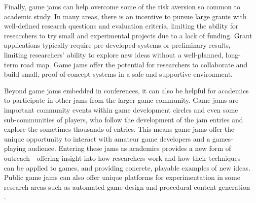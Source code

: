 \documentclass{acm_proc_article-sp}
\newcommand{\mytodo}[1]{\textbf{[[#1]]}}
\begin{document}

Finally, game jams can help overcome some of the risk aversion so common to academic study.
In many areas, there is an incentive to pursue large grants with well-defined research questions and evaluation criteria, limiting the ability for researchers to try small and experimental projects due to a lack of funding.
Grant applications typically require pre-developed systems or preliminary results, limiting researchers' ability to explore new ideas without a well-planned, long-term road map.
Game jams offer the potential for researchers to collaborate and build small, proof-of-concept systems in a safe and supportive environment.



Beyond game jams embedded in conferences, it can also be helpful for academics to participate in other jams from the larger game community.
Game jams are important community events within game development circles and even some sub-communities of players, who follow the development of the jam entries and explore the sometimes thousands of entries.
This means game jams offer the unique opportunity to interact with amateur game developers and a games-playing audience.
Entering these jams as academics provides a new form of outreach---offering insight into how researchers work and how their techniques can be applied to games, and providing concrete, playable examples of new ideas.
Public game jams can also offer unique platforms for experimentation in some research areas such as automated game design and procedural content generation \cite{cook:procjam}.
\end{document}

